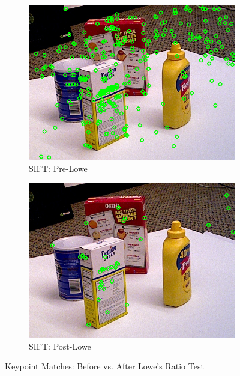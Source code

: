 \documentclass[10.5pt,a4paper]{article}
\begin{document}
\begin{figure}[h]
    \centering
    \begin{subfigure}{0.3\textwidth}
        \centering
        \includegraphics[width=\textwidth]{img/SiFT_PreLowe.png}
        \caption{SIFT: Pre-Lowe}
        \label{fig:PreLowe}
    \end{subfigure}
    \hspace{0.10\textwidth}
    \begin{subfigure}{0.3\textwidth}
        \centering
        \includegraphics[width=\textwidth]{img/SIFT_PostLowe.png}
        \caption{SIFT: Post-Lowe}
        \label{fig:PostLowe}
    \end{subfigure}
    \caption{Keypoint Matches: Before vs. After Lowe’s Ratio Test}
    \label{fig:confronto}
\end{figure}
\end{document}
